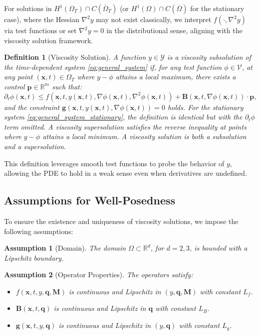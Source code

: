 \documentclass[pdflatex,sn-mathphys-num]{sn-jnl}%
\theoremstyle{thmstyleone}%
\newtheorem{assum}{Assumption}[section]
\newtheorem{defi}{Definition}[section]
\numberwithin{equation}{section}
\begin{document}
For solutions in \( H^1(\Omega_T) \cap C(\overline{\Omega}_T) \) (or \( H^1(\Omega) \cap C(\overline{\Omega}) \) for the stationary case), where the Hessian \( \nabla^2 y \) may not exist classically, we interpret \( f(\cdot, \nabla^2 y) \) via test functions or set \( \nabla^2 y = 0 \) in the distributional sense, aligning with the viscosity solution framework.

\begin{defi}[Viscosity Solution]
\label{def:viscosity_solution}
A function \( y \in \mathcal{Y} \) is a \textit{viscosity subsolution} of the time-dependent system \eqref{eq:general_system} if, for any test function \( \phi \in \mathcal{V} \), at any point \( (\bm{x}, t) \in \Omega_T \) where \( y - \phi \) attains a local maximum, there exists a control \( \bm{p} \in \mathbb{R}^m \) such that:
\[
\partial_t \phi(\bm{x}, t) \leq f(\bm{x}, t, y(\bm{x}, t), \nabla \phi(\bm{x}, t), \nabla^2 \phi(\bm{x}, t)) + \bm{B}(\bm{x}, t, \nabla \phi(\bm{x}, t)) \cdot \bm{p},
\]
and the constraint \( \bm{g}(\bm{x}, t, y(\bm{x}, t), \nabla \phi(\bm{x}, t)) = 0 \) holds. For the stationary system \eqref{eq:general_system_stationary}, the definition is identical but with the $\partial_t \phi$ term omitted. A \textit{viscosity supersolution} satisfies the reverse inequality at points where \( y - \phi \) attains a local minimum. A \textit{viscosity solution} is both a subsolution and a supersolution.
\end{defi}

This definition leverages smooth test functions to probe the behavior of \( y \), allowing the PDE to hold in a weak sense even when derivatives are undefined.

\subsection{Assumptions for Well-Posedness}

To ensure the existence and uniqueness of viscosity solutions, we impose the following assumptions:

\begin{assum}[Domain]
\label{ass:domain}
The domain \( \Omega \subset \mathbb{R}^d \), for \( d = 2, 3 \), is bounded with a Lipschitz boundary.
\end{assum}

\begin{assum}[Operator Properties]
\label{ass:operators}
The operators satisfy:
\begin{itemize}
    \item \( f(\bm{x}, t, y, \bm{q}, \bm{M}) \) is continuous and Lipschitz in \( (y, \bm{q}, \bm{M}) \) with constant \( L_f \).
    \item \( \bm{B}(\bm{x}, t, \bm{q}) \) is continuous and Lipschitz in \( \bm{q} \) with constant \( L_B \).
    \item \( \bm{g}(\bm{x}, t, y, \bm{q}) \) is continuous and Lipschitz in \( (y, \bm{q}) \) with constant \( L_g \).
\end{itemize}
\end{assum}
\end{document}
